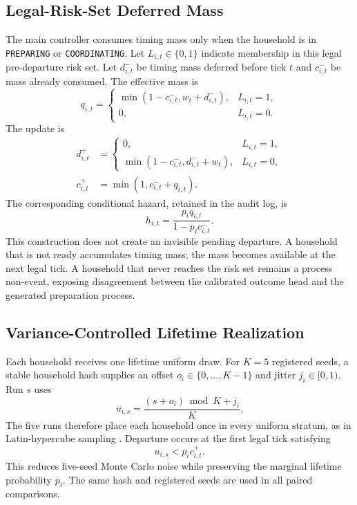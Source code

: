 \documentclass[journal]{IEEEtran}
\begin{document}
\subsection{Legal-Risk-Set Deferred Mass}
The main controller consumes timing mass only when the household is in
\texttt{PREPARING} or \texttt{COORDINATING}. Let $L_{i,t}\in\{0,1\}$ indicate
membership in this legal pre-departure risk set. Let $d_{i,t}^{-}$ be timing
mass deferred before tick $t$ and $c_{i,t}^{-}$ be mass already consumed. The
effective mass is
\begin{equation}
q_{i,t}=
\begin{cases}
\min(1-c_{i,t}^{-},w_t+d_{i,t}^{-}),&L_{i,t}=1,\\
0,&L_{i,t}=0.
\end{cases}
\label{eq:effective-mass}
\end{equation}
The update is
\begin{align}
d_{i,t}^{+}&=
\begin{cases}
0,&L_{i,t}=1,\\
\min(1-c_{i,t}^{-},d_{i,t}^{-}+w_t),&L_{i,t}=0,
\end{cases}\\
c_{i,t}^{+}&=\min(1,c_{i,t}^{-}+q_{i,t}).
\label{eq:mass-update}
\end{align}
The corresponding conditional hazard, retained in the audit log, is
\begin{equation}
h_{i,t}=\frac{p_iq_{i,t}}{1-p_ic_{i,t}^{-}}.
\label{eq:conditional-hazard}
\end{equation}
This construction does not create an invisible pending departure. A household
that is not ready accumulates timing mass; the mass becomes available at the
next legal tick. A household that never reaches the risk set remains a process
non-event, exposing disagreement between the calibrated outcome head and the
generated preparation process.

\subsection{Variance-Controlled Lifetime Realization}
Each household receives one lifetime uniform draw. For $K=5$ registered seeds,
a stable household hash supplies an offset $o_i\in\{0,\ldots,K-1\}$ and jitter
$j_i\in[0,1)$. Run $s$ uses
\begin{equation}
u_{i,s}=\frac{(s+o_i)\bmod K+j_i}{K}.
\label{eq:lhs-draw}
\end{equation}
The five runs therefore place each household once in every uniform stratum,
as in Latin-hypercube sampling \cite{mckay1979lhs}. Departure occurs at the
first legal tick satisfying
\begin{equation}
u_{i,s}<p_i c_{i,t}^{+}.
\label{eq:departure-trigger}
\end{equation}
This reduces five-seed Monte Carlo noise while preserving the marginal
lifetime probability $p_i$. The same hash and registered seeds are used in
all paired comparisons.
\end{document}
